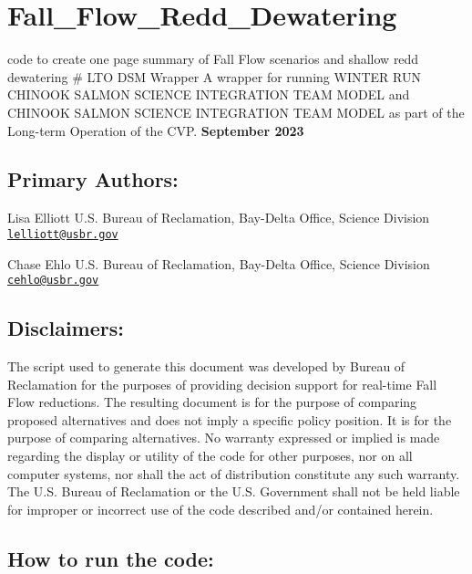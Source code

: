 \documentclass[
]{article}
\author{}
\date{\vspace{-2.5em}}
\begin{document}
\hypertarget{fall_flow_redd_dewatering}{%
\section{Fall\_Flow\_Redd\_Dewatering}\label{fall_flow_redd_dewatering}}

code to create one page summary of Fall Flow scenarios and shallow redd
dewatering \# LTO DSM Wrapper A wrapper for running WINTER RUN CHINOOK
SALMON SCIENCE INTEGRATION TEAM MODEL and CHINOOK SALMON SCIENCE
INTEGRATION TEAM MODEL as part of the Long-term Operation of the CVP.
\textbf{September 2023}

\hypertarget{primary-authors}{%
\subsection{Primary Authors:}\label{primary-authors}}

Lisa Elliott U.S. Bureau of Reclamation, Bay-Delta Office, Science
Division \href{mailto:lelliott@usbr.gov}{\nolinkurl{lelliott@usbr.gov}}

Chase Ehlo U.S. Bureau of Reclamation, Bay-Delta Office, Science
Division \href{mailto:cehlo@usbr.gov}{\nolinkurl{cehlo@usbr.gov}}

\hypertarget{disclaimers}{%
\subsection{Disclaimers:}\label{disclaimers}}

The script used to generate this document was developed by Bureau of
Reclamation for the purposes of providing decision support for real-time
Fall Flow reductions. The resulting document is for the purpose of
comparing proposed alternatives and does not imply a specific policy
position. It is for the purpose of comparing alternatives. No warranty
expressed or implied is made regarding the display or utility of the
code for other purposes, nor on all computer systems, nor shall the act
of distribution constitute any such warranty. The U.S. Bureau of
Reclamation or the U.S. Government shall not be held liable for improper
or incorrect use of the code described and/or contained herein.

\hypertarget{how-to-run-the-code}{%
\subsection{How to run the code:}\label{how-to-run-the-code}}
\end{document}
